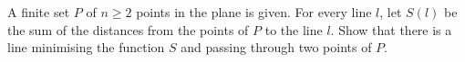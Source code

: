 A finite set $P$ of $n \geq 2$ points in the plane is given. For every line $l$, let $S(l)$ be the sum of the distances from the points of $P$ to the line $l$. Show that there is a line minimising the function $S$ and passing through two points of $P$.

